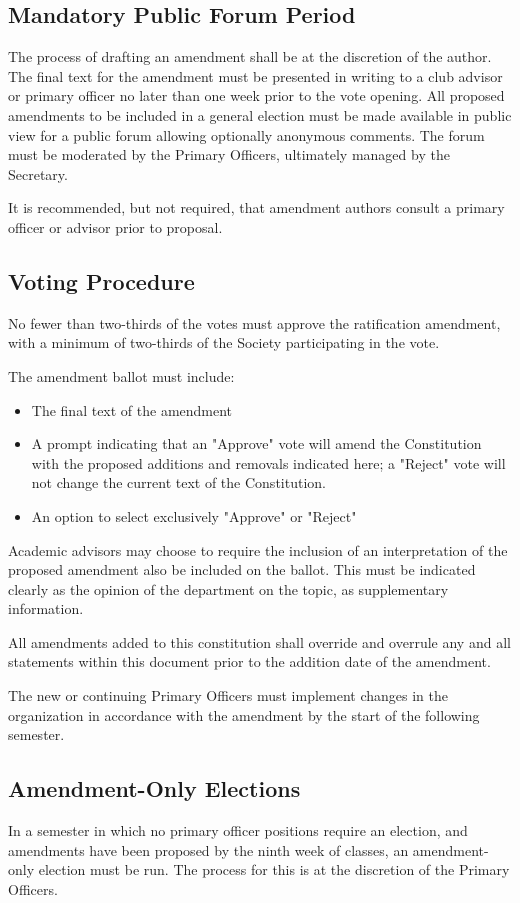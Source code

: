 \documentclass[american]{article}
\begin{document}
\subsection{Mandatory Public Forum Period}
The process of drafting an amendment shall be at the discretion of the author. The final text for the amendment must be presented in writing to a club advisor or primary officer no later than one week prior to the vote opening. All proposed amendments to be included in a general election must be made available in public view for a public forum allowing optionally anonymous comments. The forum must be moderated by the Primary Officers, ultimately managed by the Secretary.

It is recommended, but not required, that amendment authors consult a primary officer or advisor prior to proposal.

\subsection{Voting Procedure}
No fewer than two-thirds of the votes must approve the ratification amendment, with a minimum of two-thirds of the Society participating in the vote.

The amendment ballot must include:

\begin{itemize}
\item The final text of the amendment
\item A prompt indicating that an "Approve" vote will amend the Constitution with the proposed additions and removals indicated here; a "Reject" vote will not change the current text of the Constitution.
\item An option to select exclusively "Approve" or "Reject"
\end{itemize}

Academic advisors may choose to require the inclusion of an interpretation of the proposed amendment also be included on the ballot. This must be indicated clearly as the opinion of the department on the topic, as supplementary information.

All amendments added to this constitution shall override and overrule any and all statements within this document prior to the addition date of the amendment.

The new or continuing Primary Officers must implement changes in the organization in accordance with the amendment by the start of the following semester.

\subsection{Amendment-Only Elections}
In a semester in which no primary officer positions require an election, and amendments have been proposed by the ninth week of classes, an amendment-only election must be run. The process for this is at the discretion of the Primary Officers.
\end{document}
